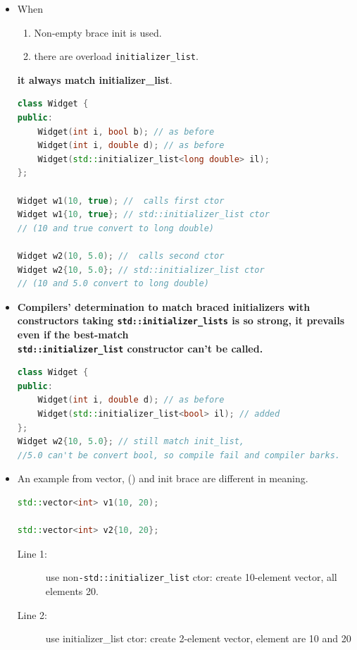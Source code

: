 \documentclass[a4paper,11pt,twoside]{book}
\begin{document}
\begin{itemize}

	\item When 
	\begin{enumerate}
		\item Non-empty brace init is used.
		\item there are overload \texttt{initializer\_list}.
	\end{enumerate}
	\textbf{it always match initializer\_list}.
\begin{lstlisting}[frame=single, language=c++,mathescape=true]
class Widget {
public:
	Widget(int i, bool b); // as before
	Widget(int i, double d); // as before
	Widget(std::initializer_list<long double> il);
};
	
Widget w1(10, true); //  calls first ctor
Widget w1{10, true}; // std::initializer_list ctor
// (10 and true convert to long double)

Widget w2(10, 5.0); //  calls second ctor
Widget w2{10, 5.0}; // std::initializer_list ctor
// (10 and 5.0 convert to long double)
\end{lstlisting}
	
	\item \textbf{ Compilers' determination to match braced initializers with constructors taking \texttt{std::initializer\_lists} is so strong, it prevails even if the best-match \\ \texttt{std::initializer\_list} constructor can't be called.}
\begin{lstlisting}[frame=single, language=c++,mathescape=true]
class Widget {
public:
	Widget(int i, double d); // as before
	Widget(std::initializer_list<bool> il); // added
};
Widget w2{10, 5.0}; // still match init_list,
//5.0 can't be convert bool, so compile fail and compiler barks.
\end{lstlisting}
	
	\item An example from vector, () and init brace are different in meaning.
\begin{lstlisting}[frame=single, language=c++,mathescape=true]
std::vector<int> v1(10, 20); 
	
std::vector<int> v2{10, 20}; 
\end{lstlisting}
\begin{description}
	\item[Line 1:] use non\texttt{-std::initializer\_list} ctor: create 10-element vector, all elements 20.
	\item[Line 2:] use initializer\_list ctor: create 2-element vector, element are 10 and 20
\end{description}
	

\end{itemize}
\end{document}
